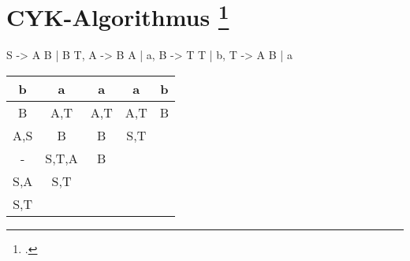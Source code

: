 \documentclass{lehramt-informatik-aufgabe}
\begin{document}
\section{CYK-Algorithmus
\footcite[Seite 46]{theo:fs:2}}

\begin{liProduktionsRegeln}
S -> A B | B T,
A -> B A | a,
B -> T T | b,
T -> A B | a
\end{liProduktionsRegeln}

\begin{liAntwort}
\begin{tabular}{|c|c|c|c|c|}
b   & a     & a   & a   & b \\\hline\hline
B   & A,T   & A,T & A,T & B \\
A,S & B     & B   & S,T \\
-   & S,T,A & B \\
S,A & S,T \\
S,T \\
\end{tabular}
\end{liAntwort}
\end{document}
